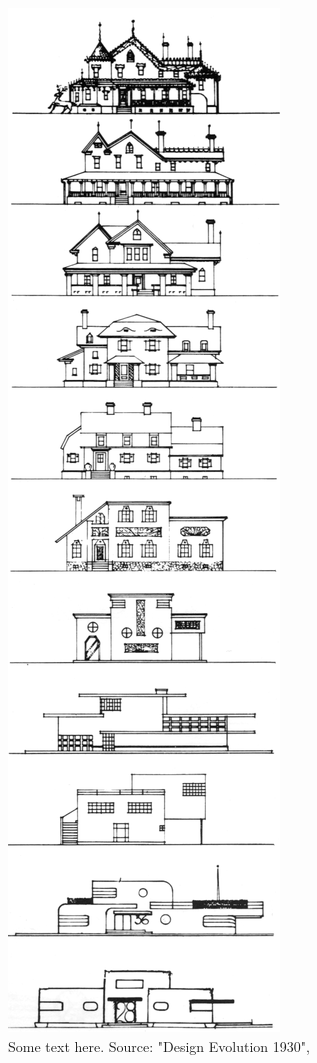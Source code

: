 \documentclass{article}
\begin{document}
\begin{figure}[]
    \centering
    \includegraphics[height=\textheight]{./figures/loewy_architecture.png}
    \caption{
        Some text here. Source: "Design Evolution 1930", \cite{loewy_industrial_1979}
    }
    \label{fig:combined}
\end{figure}
\end{document}
